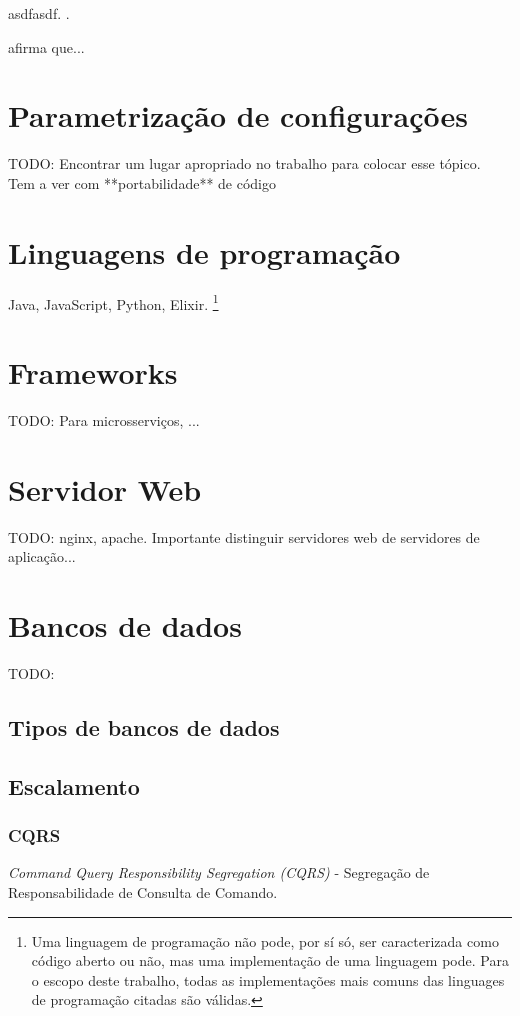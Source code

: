 asdfasdf. \cite{Tanembaum-Steen}.

 afirma que...

\section{Parametrização de configurações}
TODO: Encontrar um lugar apropriado no trabalho para colocar esse tópico. Tem a ver com **portabilidade** de código

\section{Linguagens de programação}
Java, JavaScript, Python, Elixir. \footnote{Uma linguagem de programação não pode, por sí só, ser caracterizada como código aberto ou não, mas uma implementação de uma linguagem pode. Para o escopo deste trabalho, todas as implementações mais comuns das linguages de programação citadas são válidas.}


\section{Frameworks}
TODO: Para microsserviços, ...

\section{Servidor Web}
TODO: nginx, apache. 
Importante distinguir servidores web de servidores de aplicação...

\section{Bancos de dados}
TODO:

\subsection{Tipos de bancos de dados}


\subsection{Escalamento}

\subsubsection{CQRS}
\emph{Command Query Responsibility Segregation (CQRS)} - Segregação de Responsabilidade de Consulta de Comando. 

